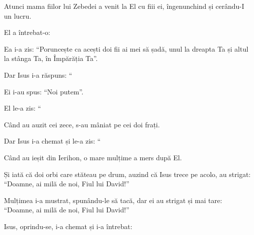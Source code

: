 {\par }{\PP {}Atunci mama fiilor lui Zebedei a venit la El cu fiii ei, îngenunchind și cerându-I un lucru.

El a întrebat-o:
{}

\par }{\PP Ea i-a zis: “Poruncește ca acești doi fii ai mei să șadă, unul la dreapta Ta și altul la stânga Ta, în Împărăția Ta”.


\par }{\PP {}Dar Isus i-a răspuns: “{}

\par }{\PP Ei i-au spus: “Noi putem”.


\par }{\PP {}El le-a zis: “{}


\par }{\PP {}Când au auzit cei zece, s-au mâniat pe cei doi frați.


\par }{\PP {}Dar Isus i-a chemat și le-a zis: “{}





\par }{\PP {}Când au ieșit din Ierihon, o mare mulțime a mers după El.

Și iată că doi orbi care stăteau pe drum, auzind că Isus trece pe acolo, au strigat: “Doamne, ai milă de noi, Fiul lui David!”

Mulțimea i-a mustrat, spunându-le să tacă, dar ei au strigat și mai tare: “Doamne, ai milă de noi, Fiul lui David!”


\par }{\PP {}Isus, oprindu-se, i-a chemat și i-a întrebat:
{}


}
